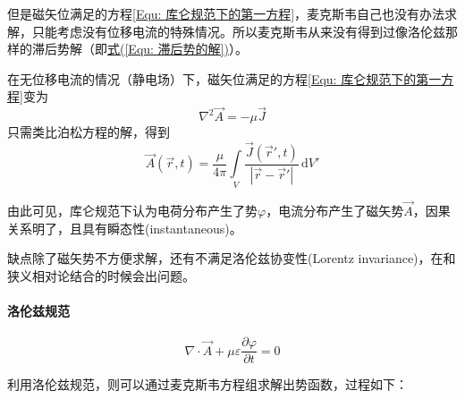    但是磁矢位满足的方程\eqref{Equ: 库仑规范下的第一方程}，麦克斯韦自己也没有办法求解，只能考虑没有位移电流的特殊情况。所以麦克斯韦从来没有得到过像洛伦兹那样的滞后势解（即\hyperref[Equ: 滞后势的解]{式(\ref*{Equ: 滞后势的解})}）。

    在无位移电流的情况（静电场）下，磁矢位满足的方程\eqref{Equ: 库仑规范下的第一方程}变为
    \begin{equation}
        \nabla^2 \vec{A}=-\mu \vec{J}
    \end{equation}
    只需类比泊松方程的解，得到
    \begin{equation}
        \vec{A}(\vec{r},t)=\frac{\mu}{4\pi}\int\limits_V \frac{\vec{J}(\vec{r}',t)}{|\vec{r}-\vec{r}'|}\,\mathrm{d}V'
    \end{equation}

    由此可见，库仑规范下认为电荷分布产生了势$\varphi$，电流分布产生了磁矢势$\vec{A}$，因果关系明了，且具有瞬态性(instantaneous)。
    
    缺点除了磁矢势不方便求解，还有不满足洛伦兹协变性(Lorentz invariance)，在和狭义相对论结合的时候会出问题。
    
    \paragraph{洛伦兹规范}
    \begin{equation}
        \nabla\cdot\vec{A}+\mu \varepsilon\frac{\partial \varphi}{\partial t}=0
    \end{equation}
    
    利用洛伦兹规范，则可以通过麦克斯韦方程组求解出势函数，过程如下：
    
